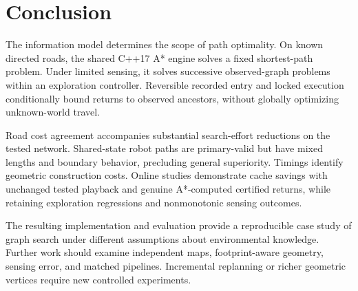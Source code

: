\section{Conclusion}
The information model determines the scope of path optimality. On known directed roads, the shared C++17 A* engine solves a fixed shortest-path problem. Under limited sensing, it solves successive observed-graph problems within an exploration controller. Reversible recorded entry and locked execution conditionally bound returns to observed ancestors, without globally optimizing unknown-world travel.

Road cost agreement accompanies substantial search-effort reductions on the tested network. Shared-state robot paths are primary-valid but have mixed lengths and boundary behavior, precluding general superiority. Timings identify geometric construction costs. Online studies demonstrate cache savings with unchanged tested playback and genuine A*-computed certified returns, while retaining exploration regressions and nonmonotonic sensing outcomes.

The resulting implementation and evaluation provide a reproducible case study of graph search under different assumptions about environmental knowledge. Further work should examine independent maps, footprint-aware geometry, sensing error, and matched pipelines. Incremental replanning or richer geometric vertices require new controlled experiments.
